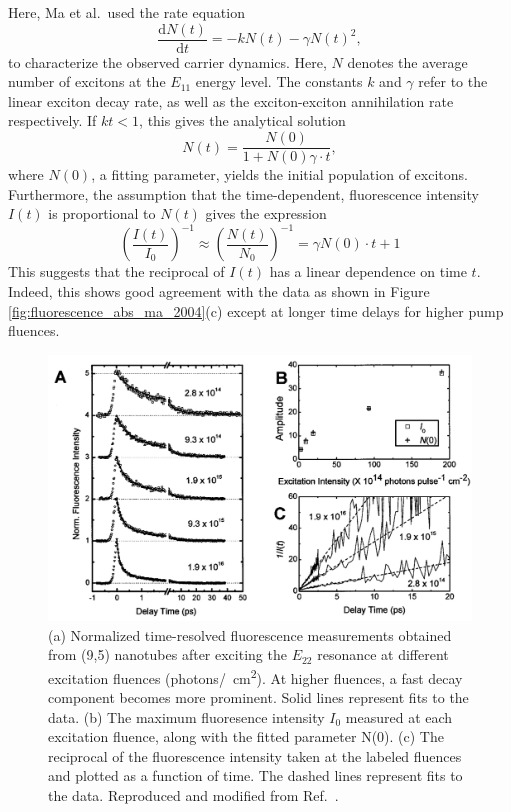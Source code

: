 %
Here, Ma et al.\ used the rate equation
\begin{equation}
	\dfrac{\mathrm{d}N(t)}{\mathrm{d}t} = - k N(t) - \gamma N(t)^2,
\end{equation}
to characterize the observed carrier dynamics. Here, $N$ denotes the average number of excitons at the $E_{11}$ energy level. The constants $k$ and $\gamma$ refer to the linear exciton decay rate, as well as the exciton-exciton annihilation rate respectively. If $kt < 1$, this gives the analytical solution
\begin{equation}
	N(t) = \dfrac{N(0)}{1 + N(0)\gamma \cdot t},
\end{equation}
where $N(0)$, a fitting parameter, yields the initial population of excitons. Furthermore, the assumption that the time-dependent, fluorescence intensity $I(t)$ is proportional to $ N(t)$ gives the expression
\begin{equation}
  	\left( \dfrac{I(t)}{I_0} \right)^{-1} \approx \left( \dfrac{N(t)}{N_0} \right)^{-1} = \gamma N(0) \cdot t + 1
\end{equation}
This suggests that the reciprocal of $I(t)$ has a linear dependence on time $t$. Indeed, this shows good agreement with the data as shown in Figure \ref{fig:fluorescence_abs_ma_2004}(c) except at longer time delays for higher pump fluences.

\begin{figure}[H]
	\centering
	\includegraphics[scale=0.35]{images/chapter_prior_works/fluorescence_2_ma_2004}
	\caption{(a) Normalized time-resolved fluorescence measurements obtained from (9,5) nanotubes after exciting the $E_{22}$ resonance at different excitation fluences (photons\si{/\cm \squared}). At higher fluences, a fast decay component becomes more prominent. Solid lines represent fits to the data. (b) The maximum fluoresence intensity $I_0$ measured at each excitation fluence, along with the fitted parameter N(0). (c) The reciprocal of the fluorescence intensity taken at the labeled fluences and plotted as a function of time. The dashed lines represent fits to the data. Reproduced and modified from Ref.\ \cite{ma2004ultrafast}.}
	\label{fig:fluorescence_ma_2004}
\end{figure}

